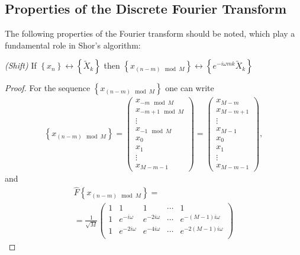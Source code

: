 \subsection{Properties of the Discrete Fourier Transform}
The following properties of the Fourier transform should be noted, which
play a fundamental role in Shor's algorithm:

\begin{lemma}
\emph{(Shift)}
\label{lemmaAddFourierDiscretFourierShiftTime}
If $\left\{x_n\right\} \longleftrightarrow \left\{\tilde{X}_k\right\}$ then
$\left\{x_{\left(n - m\right) \mod M}\right\} \longleftrightarrow
\left\{e^{-i \omega m k}\tilde{X}_k\right\}$ 
\end{lemma}

\begin{proof}
For the sequence $\left\{x_{\left(n - m\right) \mod M}\right\}$
one can write
\begin{eqnarray}
\left\{x_{\left(n - m\right) \mod M}\right\} = 
\begin{pmatrix}
x_{-m \mod M} \\
x_{-m+1 \mod M}\\ 
\vdots \\
x_{-1 \mod M}\\
x_0 \\
x_1 \\
\vdots \\
x_{M - m - 1}
\end{pmatrix} = 
\begin{pmatrix}
x_{M - m} \\
x_{M - m + 1}\\ 
\vdots \\
x_{M - 1}\\
x_0 \\
x_1 \\
\vdots \\
x_{M - m - 1}
\end{pmatrix},
\nonumber
\end{eqnarray}
and
\begin{eqnarray}
\hat{F}\left\{x_{\left(n - m\right) \mod M}\right\} = 
\nonumber \\
= \frac{1}{\sqrt{M}}
\begin{pmatrix}
1 & 1 & 1 & \cdots & 1 \\
1 & e^{-i \omega} & e^{-2 i \omega} & \cdots & 
e^{-\left( M - 1 \right) i \omega} \\
1 & e^{-2 i \omega} & e^{-4 i \omega} & \cdots & 
e^{-2 \left( M - 1 \right) i \omega} \\

\end{pmatrix}
\end{eqnarray}
\end{proof}
